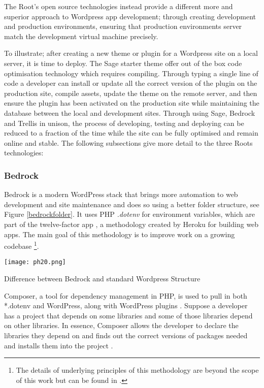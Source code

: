 \documentclass[fontsize=11pt]{extarticle}
\numberwithin{figure}{section} %
\begin{document}
The Root's open source technologies instead provide a different more and
superior approach to Wordpress app development; through creating
development and production environments, ensuring that production
environments server match the development virtual machine precisely.

To illustrate; after creating a new theme or plugin for a Wordpress site
on a local server, it is time to deploy. The Sage starter theme offer
out of the box code optimisation technology which requires compiling.
Through typing a single line of code a developer can install or update
all the correct version of the plugin on the production site, compile
assets, update the theme on the remote server, and then ensure the
plugin has been activated on the production site while maintaining the
database between the local and development sites. Through using Sage,
Bedrock and Trellis in unison, the process of developing, testing and
deploying can be reduced to a fraction of the time while the site can be
fully optimised and remain online and stable. The following subsections
give more detail to the three Roots technologies:

\hypertarget{bedrock}{%
\subsubsection{Bedrock}\label{bedrock}}

Bedrock is a modern WordPress stack that brings more automation to web
development and site maintenance and does so using a better folder
structure, see Figure \ref{bedrockfolder}. It uses PHP \emph{.dotenv}
for environment variables, which are part of the twelve-factor app
\cite{p6}, a methodology created by Heroku for building web
apps\cite{p5}. The main goal of this methodology is to improve work on a
growing codebase
\footnote{The details of underlying principles of this methodology are beyond the scope of this work but can be found in \cite{p8}.}.

\begin{table}[H]
      \centering
      \texttt{[image: ph20.png]}
      \caption{Difference between Bedrock and standard Wordpress Structure}
\label{bedrockfolder}
 \end{table}

Composer, a tool for dependency management in PHP, is used to pull in
both *.dotenv and WordPress, along with WordPress plugins \cite{p7}.
Suppose a developer has a project that depends on some libraries and
some of those libraries depend on other libraries. In essence, Composer
allows the developer to declare the libraries they depend on and finds
out the correct versions of packages needed and installs them into the
project \cite{p8}.
\end{document}
